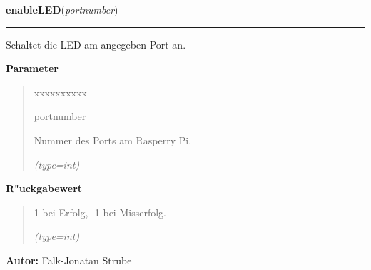 \hspace{.8\funcindent}\begin{boxedminipage}{\funcwidth}

    \raggedright \textbf{enableLED}(\textit{portnumber})

    \vspace{-1.5ex}

    \rule{\textwidth}{0.5\fboxrule}
\setlength{\parskip}{2ex}
    Schaltet die LED am angegeben Port an.

\setlength{\parskip}{1ex}
      \textbf{Parameter}
      \vspace{-1ex}

      \begin{quote}
        \begin{Ventry}{xxxxxxxxxx}

          \item[portnumber]

          Nummer des Ports am Rasperry Pi.

            {\it (type=int)}

        \end{Ventry}

      \end{quote}

      \textbf{R"uckgabewert}
    \vspace{-1ex}

      \begin{quote}
      1 bei Erfolg, -1 bei Misserfolg.

      {\it (type=int)}

      \end{quote}

\textbf{Autor:} Falk-Jonatan Strube



    \end{boxedminipage}

    \label{ledleuchtturm:ledFunc:switchAllOff}

    \vspace{0.5ex}

